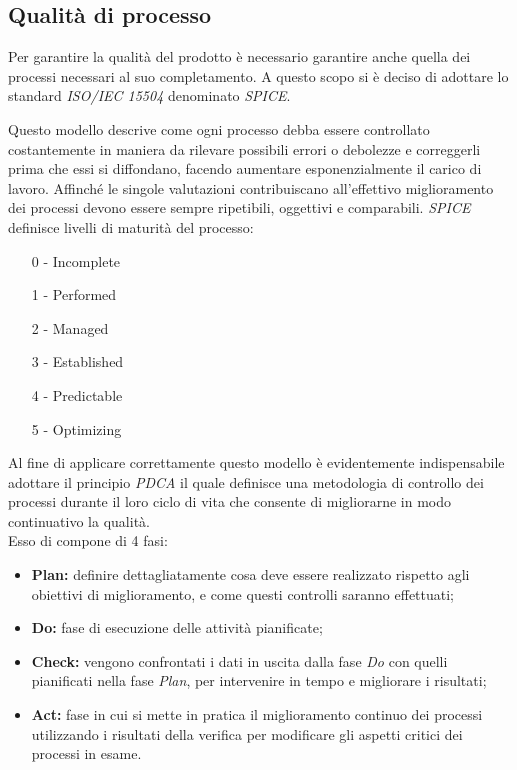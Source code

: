 \documentclass[a4paper]{report}
\begin{document}
			\subsection{Qualità di processo}
				Per garantire la qualità del prodotto è necessario garantire anche quella dei processi necessari 
				al suo completamento. A questo scopo si è deciso di adottare lo standard 
				\emph{ISO/IEC 15504} denominato \emph{SPICE}.
				
				Questo modello descrive come ogni processo debba essere controllato costantemente in maniera da 
				rilevare possibili errori o debolezze e correggerli prima che essi si diffondano, facendo 
				aumentare esponenzialmente il carico di lavoro. Affinché le singole valutazioni contribuiscano 
				all'effettivo miglioramento dei processi devono essere sempre ripetibili, oggettivi e comparabili.
				\emph{SPICE} definisce livelli di maturità del processo:
				\begin{itemize}
					\item[0] - Incomplete
					\item[1] - Performed
					\item[2] - Managed
					\item[3] - Established
					\item[4] - Predictable
					\item[5] - Optimizing					
				\end{itemize}
				Al fine di applicare correttamente questo modello è evidentemente indispensabile adottare il 
				principio \emph{PDCA} il quale definisce una metodologia di controllo dei processi durante il loro 
				ciclo di vita che consente di migliorarne in modo continuativo la qualità. \\ 
				Esso di compone di 4 fasi:
				\begin{itemize}
					\item \textbf{Plan:} definire dettagliatamente cosa deve essere realizzato rispetto agli 
					obiettivi di miglioramento, e come questi controlli saranno effettuati;
					\item \textbf{Do:} fase di esecuzione delle attività pianificate;
					\item \textbf{Check:} vengono confrontati i dati in uscita dalla fase \emph{Do} con quelli 
					pianificati nella fase \emph{Plan}, per intervenire in tempo e migliorare i risultati;
					\item \textbf{Act:} fase in cui si mette in pratica il miglioramento continuo dei processi
					 utilizzando i risultati della verifica per modificare gli aspetti critici dei processi in esame.
				\end{itemize}
\end{document}
